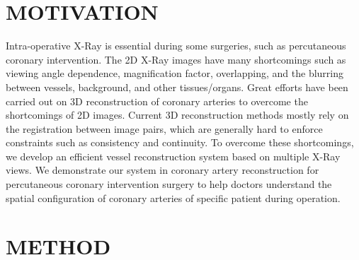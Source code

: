 \documentclass[10pt, conference, compsocconf]{IEEEtran}
\begin{document}

\section{MOTIVATION}

Intra-operative X-Ray is essential during some surgeries, such as
percutaneous coronary intervention. The 2D X-Ray images have many
shortcomings such as viewing angle dependence, magnification factor,
overlapping, and the blurring between vessels, background, and other
tissues/organs. Great efforts have been carried out on 3D
reconstruction of coronary arteries to overcome the shortcomings of 2D
images. Current 3D reconstruction methods mostly rely on the
registration between image pairs, which are generally hard to enforce
constraints such as consistency and continuity. To overcome these
shortcomings, we develop an efficient vessel reconstruction system
based on multiple X-Ray views. We demonstrate our system in coronary
artery reconstruction for percutaneous coronary intervention surgery
to help doctors understand the spatial configuration of coronary
arteries of specific patient during operation.


\section{METHOD}
%
%
\end{document}
